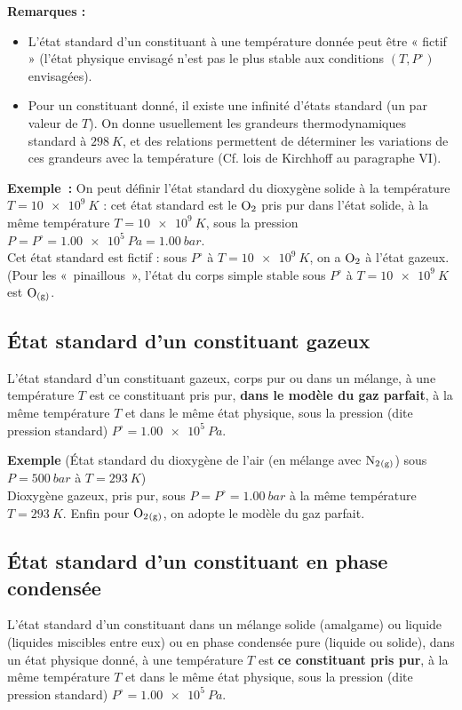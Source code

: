\documentclass{article}
\begin{document}
\noindent\textbf{Remarques :}
\begin{itemize}
    \item L’état standard d’un constituant à une température donnée peut être « fictif » (l’état physique envisagé n’est pas le plus stable aux conditions $(T,P^\circ)$ envisagées).
    \item Pour un constituant donné, il existe une infinité d’états standard (un par valeur de $T$). On donne usuellement les grandeurs thermodynamiques standard à $\SI{298}{K}$, et des relations permettent de déterminer les variations de ces grandeurs avec la température (Cf. lois de Kirchhoff au paragraphe \textsf{VI}).
\end{itemize}
\begin{tableau}
    \textbf{Exemple~:} On peut définir l'état standard du dioxygène solide à la température $T=\SI{10e9}{K}$ : cet état standard est le $\ce{O2}$ pris pur dans l'état solide, à la même température $T=\SI{10e9}{K}$, sous la pression $P=P^\circ = \SI{1,00e5}{Pa} = \SI{1,00}{bar}$.\\
    Cet état standard est fictif : sous $P^\circ$ à $T=\SI{10e9}{K}$, on a $\ce{O2}$ à l'état gazeux. (Pour les «~pinaillous~», l'état du corps simple stable sous $P^\circ$ à $T=\SI{10e9}{K}$ est $\ce{O_{(g)}}$.
\end{tableau}

\subsection{État standard d’un constituant gazeux}
\begin{enonce}
    L’état standard d’un constituant gazeux, corps pur ou dans un mélange, à une température $T$ est ce constituant pris pur, \textbf{dans le modèle du gaz parfait}, à la même température $T$ et dans le même état physique, sous la pression (dite pression standard) $P^\circ = \SI{1,00e5}{Pa}$.
\end{enonce}
\begin{tableau}
    \textbf{Exemple} (État standard du dioxygène de l'air (en mélange avec $\ce{N2_{(g)}}$) sous $P=\SI{500}{bar}$ à $T=\SI{293}{K}$)\\
    Dioxygène gazeux, pris pur, sous $P=P^\circ=\SI{1,00}{bar}$ à la même température $T=\SI{293}{K}$. Enfin pour $\ce{O2_{(g)}}$, on adopte le modèle du gaz parfait.
\end{tableau}
\subsection{État standard d'un constituant en phase condensée}
\begin{enonce}
    L’état standard d’un constituant dans un mélange solide (amalgame) ou liquide (liquides miscibles entre eux) ou en phase condensée pure (liquide ou solide), dans un état physique donné, à une température $T$ est \textbf{ce constituant pris pur}, à la même température $T$ et dans le même état physique, sous la pression (dite pression standard) $P^\circ = \SI{1,00e5}{Pa}$.
\end{enonce}
\end{document}
